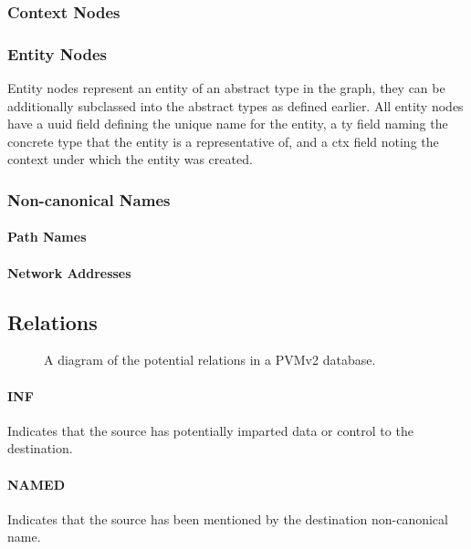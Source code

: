 \documentclass[12pt,twoside,a4paper]{article}
\begin{document}
\subsubsection{Context Nodes}


\subsubsection{Entity Nodes}
Entity nodes represent an entity of an abstract type in the graph, they can be additionally subclassed into the abstract types as defined earlier. All entity nodes have a uuid field defining the unique name for the entity, a ty field naming the concrete type that the entity is a representative of, and a ctx field noting the context under which the entity was created.

\subsubsection{Non-canonical Names}

\paragraph{Path Names}

\paragraph{Network Addresses}

\subsection{Relations}

\begin{figure}[h]
\centering

\caption{A diagram of the potential relations in a PVMv2 database.}
\end{figure}

\paragraph{INF}
Indicates that the source has potentially imparted data or control to the destination.

\paragraph{NAMED}
Indicates that the source has been mentioned by the destination non-canonical name.
\end{document}
